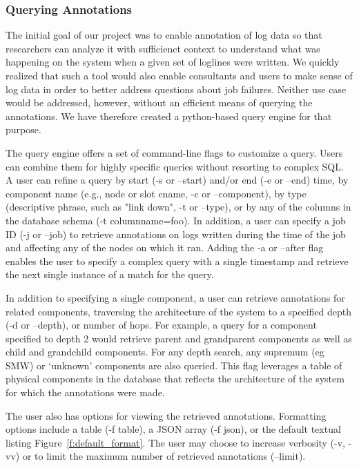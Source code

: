 \subsubsection{Querying Annotations}
\label{s:querying}
The initial goal of our project was to enable annotation of log data so that researchers can analyze it with sufficienct context to understand what was happening on the system when a given set of loglines were written. We quickly realized that such a tool would also enable consultants and users to make sense of log data in order to better address questions about job failures. Neither use case would be addressed, however, without an efficient means of querying the annotations. We have therefore created a python-based query engine for that purpose.

The query engine offers a set of command-line flags to customize a query. Users can combine them for highly specific queries without resorting to complex SQL. A user can refine a query by start (-s or --start) and/or end (-e or --end) time, by component name (e.g., node or slot cname, -c or --component), by type (descriptive phrase, such as "link down", -t or --type), or by any of the columns in the database schema (-t columnname=foo). In addition, a user can specify a job ID (-j or --job) to retrieve annotations on logs written during the time of the job and affecting any of the nodes on which it ran. Adding the -a or --after flag enables the user to specify a complex query with a single timestamp and retrieve the next single instance of a match for the query.

In addition to specifying a single component, a user can retrieve annotations for related components, traversing the architecture of the system to a specified depth (-d or --depth), or number of hops. For example, a query for a component specified to depth 2 would retrieve parent and grandparent components as well as child and grandchild components. 
For any depth search, any supremum (eg SMW) or `unknown' components are also queried.
This flag leverages a table of physical components in the database that reflects the architecture of the system for which the annotations were made. 

The user also has options for viewing the retrieved annotations. Formatting options include a table (-f table), a JSON array (-f json), or the default textual listing Figure~\ref{f:default_format}. The user may choose to increase verbosity (-v, -vv) or to limit the maximum number of retrieved annotations (--limit).

